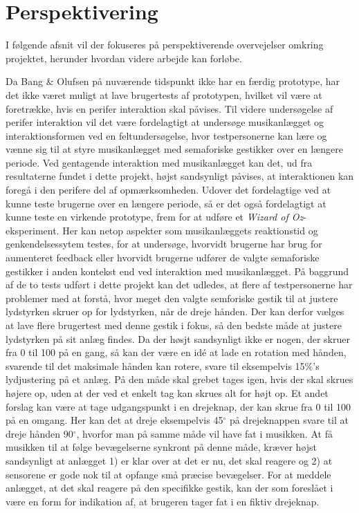 \chapter{Perspektivering}
\label{Perspektivering}
%
I følgende afsnit vil der fokuseres på perspektiverende overvejelser omkring projektet, herunder hvordan videre arbejde kan forløbe.

Da Bang $\&$ Olufsen på nuværende tidspunkt ikke har en færdig prototype, har det ikke været muligt at lave brugertests af prototypen, hvilket vil være at foretrække, hvis en perifer interaktion skal påvises. Til videre undersøgelse af perifer interaktion vil det være fordelagtigt at undersøge musikanlægget og interaktionsformen ved en feltundersøgelse, hvor testpersonerne kan lære og vænne sig til at styre musikanlægget med semaforiske gestikker over en længere periode. Ved gentagende interaktion med musikanlægget kan det, ud fra resultaterne fundet i dette projekt, højst sandsynligt påvises, at interaktionen kan foregå i den perifere del af opmærksomheden. Udover det fordelagtige ved at kunne teste brugerne over en længere periode, så er det også fordelagtigt at kunne teste en virkende prototype, frem for at udføre et \textit{Wizard of Oz}-eksperiment. Her kan netop aspekter som musikanlæggets reaktionstid og genkendelsessytem testes, for at undersøge, hvorvidt brugerne har brug for aumenteret feedback eller hvorvidt brugerne udfører de valgte semaforiske gestikker i anden kontekst end ved interaktion med musikanlægget.\blankline
%
På baggrund af de to tests udført i dette projekt kan det udledes, at flere af testpersonerne har problemer med at forstå, hvor meget den valgte semforiske gestik til at justere lydstyrken skruer op for lydstyrken, når de dreje hånden. Der kan derfor vælges at lave flere brugertest med denne gestik i fokus, så den bedste måde at justere lydstyrken på sit anlæg findes. Da der høsjt sandsynligt ikke er nogen, der skruer fra 0 til 100 på en gang, så kan der være en idé at lade en rotation med hånden, svarende til det maksimale hånden kan rotere, svare til eksempelvis 15$\%$'s lydjustering på et anlæg. På den måde skal grebet tages igen, hvis der skal skrues højere op, uden at der ved et enkelt tag kan skrues alt for højt op. Et andet forslag kan være at tage udgangspunkt i en drejeknap, der kan skrue fra 0 til 100 på en omgang. Her kan det at dreje eksempelvis 45$^{\circ}$ på drejeknappen svare til at dreje hånden 90$^{\circ}$, hvorfor man på samme måde vil have fat i musikken. At få musikken til at følge bevægelserne synkront på denne måde, kræver højst sandsynligt at anlægget 1) er klar over at det er nu, det skal reagere og 2) at sensorene er gode nok til at opfange små præcise bevægelser. For at meddele anlægget, at det skal reagere på den specifikke gestik, kan der som foreslået i  være en form for indikation af, at brugeren tager fat i en fiktiv drejeknap.\blankline
